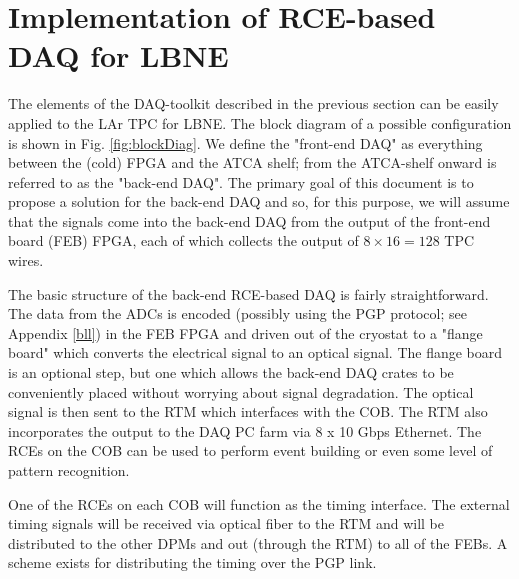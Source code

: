 \section{Implementation of RCE-based DAQ for LBNE}


The elements of the DAQ-toolkit described in the previous section can be easily applied to the LAr TPC for LBNE.  The block diagram of a possible configuration is shown in Fig. \ref{fig:blockDiag}.  We define the "front-end DAQ" as everything between the (cold) FPGA and the ATCA shelf; from the ATCA-shelf onward is referred to as the "back-end DAQ".    The primary goal of this document is to propose a solution for the back-end DAQ and so, for this purpose, we will assume that the signals come into the back-end DAQ from the output of the front-end board (FEB) FPGA, each of which collects the output of  $8\times 16 = 128$ TPC wires.  

The basic structure of the back-end RCE-based DAQ is fairly straightforward.  The data from the ADCs is encoded (possibly using the PGP protocol; see Appendix \ref{bll}) in the FEB FPGA and driven out of the cryostat to a "flange board" which converts the electrical signal to an optical signal.  The flange board is an optional step, but one which allows the back-end DAQ crates to be conveniently placed without worrying about signal degradation.   The optical signal is then sent to the RTM which interfaces with the COB.  The RTM also incorporates the output to the DAQ PC farm via 8 x 10 Gbps Ethernet.  The RCEs on the COB can be used to perform event building or even some level of pattern recognition. 

One of the RCEs on each COB will function as the timing interface.  The  external timing  signals will be received via optical fiber to the RTM and will be distributed to the other DPMs and out (through the RTM) to all of the FEBs.  A scheme exists for distributing the timing over the PGP link.  




